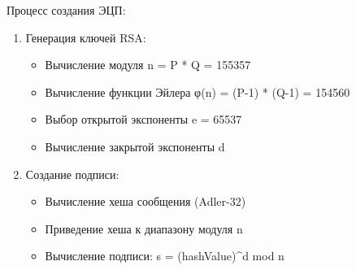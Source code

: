 \documentclass[a4paper, 14pt]{extarticle}
\begin{document}
Процесс создания ЭЦП:
\begin{enumerate}
    \item Генерация ключей RSA:
    \begin{itemize}
        \item Вычисление модуля n = P * Q = 155357
        \item Вычисление функции Эйлера φ(n) = (P-1) * (Q-1) = 154560
        \item Выбор открытой экспоненты e = 65537
        \item Вычисление закрытой экспоненты d
    \end{itemize}
    \item Создание подписи:
    \begin{itemize}
        \item Вычисление хеша сообщения (Adler-32)
        \item Приведение хеша к диапазону модуля n
        \item Вычисление подписи: s = (hashValue)^d mod n
    \end{itemize}
\end{enumerate}
\end{document}
